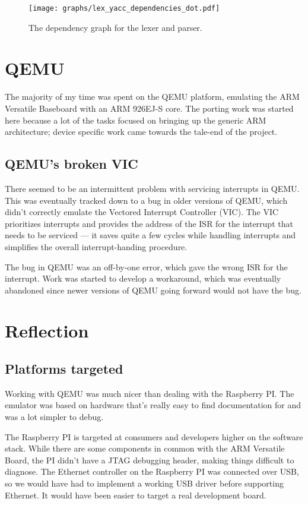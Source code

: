 \documentclass[12pt]{article}
\begin{document}
\begin{figure}
\caption{The dependency graph for the lexer and parser.}
\label{lex-yacc-dependencies}
\texttt{[image: graphs/lex\_yacc\_dependencies\_dot.pdf]}
\end{figure}

\section{QEMU}

The majority of my time was spent on the QEMU platform, emulating the ARM
Versatile Baseboard with an ARM 926EJ-S core. The porting work was started here
because a lot of the tasks focused on bringing up the generic ARM architecture;
device specific work came towards the tale-end of the project.

\subsection{QEMU's broken VIC}

There seemed to be an intermittent problem with servicing interrupts in QEMU.
This was eventually tracked down to a bug in older versions of QEMU, which
didn't correctly emulate the Vectored Interrupt Controller (VIC). The VIC
prioritizes interrupts and provides the address of the ISR for the interrupt
that needs to be serviced \---- it saves quite a few cycles while handling
interrupts and simplifies the overall interrupt-handing procedure.

The bug in QEMU was an off-by-one error, which gave the wrong ISR for the
interrupt. Work was started to develop a workaround, which was eventually
abandoned since newer versions of QEMU going forward would not have the bug.

\section{Reflection}

\subsection{Platforms targeted}

Working with QEMU was much nicer than dealing with the Raspberry PI. The
emulator was based on hardware that's really easy to find documentation for and
was a lot simpler to debug.

The Raspberry PI is targeted at consumers and developers higher on the software
stack. While there are some components in common with the ARM Versatile Board,
the PI didn't have a JTAG debugging header, making things difficult to
diagnose. The Ethernet controller on the Raspberry PI was connected over USB,
so we would have had to implement a working USB driver before supporting
Ethernet. It would have been easier to target a real development board.
\end{document}
